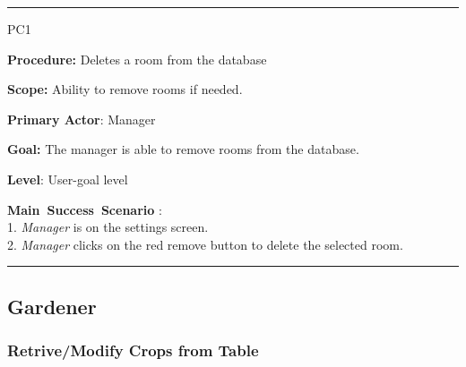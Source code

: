 \vspace{0.5cm}
\hrule
\hfill \break
\begin{lyxlist}{PC1}
\small{
\item [\textbf{Procedure:}] Deletes a room from the database
\item [\textbf{Scope:}] Ability to remove rooms if needed.
\item [\textbf{Primary Actor}:] Manager
\item [\textbf{Goal:}] The manager is able to remove rooms from the database.
\item [\textbf{Level}:] User-goal level
\item [\textbf{Main~Success~Scenario}]:\\
1. \emph{Manager} is on the settings screen. \\
2. \emph{Manager} clicks on the red remove button to delete the selected room.
}
\end{lyxlist}
\hrule
\vspace{0.5cm}
\break




\subsection{Gardener}
\subsubsection{Retrive/Modify Crops from Table}

